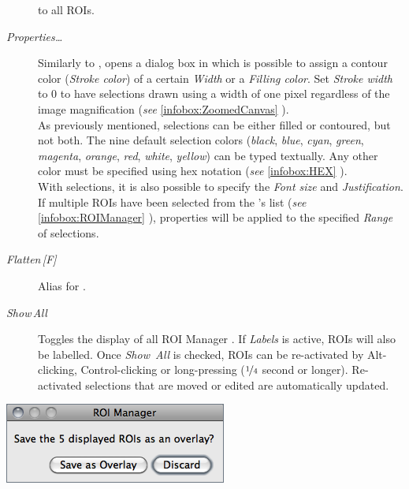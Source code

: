 \begin{description}
to all ROIs.
\item [{\emph{\label{misc:RM-Properties}Properties\ldots{}}}] Similarly
to ,
opens a dialog box in which is possible to assign a contour color
(\emph{Stroke color}) of a certain \emph{Width} or a \emph{Filling
color}. Set \emph{Stroke width} to 0 to have selections drawn using
a width of one pixel regardless of the image magnification (\emph{see}
\ref{infobox:ZoomedCanvas} ).\\
As previously mentioned, selections can be either filled or contoured,
but not both. The nine default selection colors (\emph{black}, \emph{blue},
\emph{cyan}, \emph{green}, \emph{magenta}, \emph{orange}, \emph{red},
\emph{white}, \emph{yellow}) can be typed textually. Any other color
must be specified using hex notation (\emph{see} \ref{infobox:HEX}
).\\
With  selections, it is also possible to specify
the \emph{Font size} and \emph{Justification}.\\
If multiple ROIs have been selected from the 's
list (\emph{see} \ref{infobox:ROIManager} ),
properties will be applied to the specified \emph{Range} of selections. 
\item [{\emph{Flatten\,{[}F{]}}}] Alias for .
\item [{\emph{\label{misc:RM-ShowAll}Show\,All}}] \improvement{}Toggles
the display of all ROI
Manager . If \emph{Labels} is active,
ROIs will also be labelled. Once \emph{Show~All} is checked, ROIs
can be re-activated by Alt-clicking, Control-clicking or long-pressing
($\nicefrac{1}{4}$ second or longer). Re-activated selections that
are moved or edited are automatically updated. 
\end{description}
\begin{minipage}[c][1\totalheight][t]{0.366\columnwidth}%
\begin{description}
\item [{\includegraphics[scale=0.5]{images/ROIManagerClosing}}]~\end{description}
%
\end{minipage}\feature{}%
